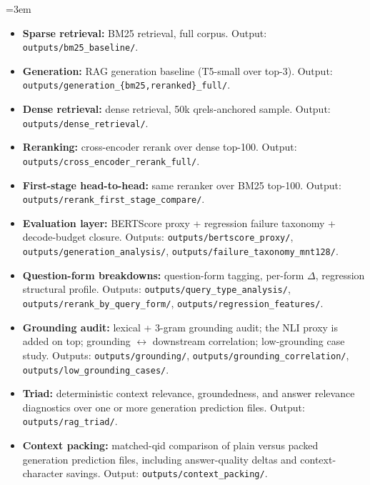 \documentclass[11pt,a4paper]{article}
\newcommand{\bertscore}{BERTScore}
\newcommand{\bmtwofive}{BM25}
\newcommand{\code}[1]{\texttt{#1}}
\begin{document}
\begingroup
\sloppy
\emergencystretch=3em
\begin{itemize}
  \item \textbf{Sparse retrieval:} \bmtwofive{} retrieval, full corpus.  Output:
        \texttt{outputs/bm25\_baseline/}.
  \item \textbf{Generation:} RAG generation baseline (T5-small over top-3).
        Output:
        \code{outputs/generation\_\allowbreak \{bm25,reranked\}\_\allowbreak full/}.
  \item \textbf{Dense retrieval:} dense retrieval, 50k qrels-anchored sample.
        Output: \texttt{outputs/dense\_retrieval/}.
  \item \textbf{Reranking:} cross-encoder rerank over dense top-100.
        Output: \texttt{outputs/cross\_encoder\_rerank\_full/}.
  \item \textbf{First-stage head-to-head:} same reranker over \bmtwofive{} top-100.
        Output:
        \code{outputs/rerank\_\allowbreak first\_\allowbreak stage\_\allowbreak compare/}.
  \item \textbf{Evaluation layer:} \bertscore{} proxy + regression failure
        taxonomy + decode-budget closure.  Outputs:
        \code{outputs/bertscore\_\allowbreak proxy/},
        \code{outputs/generation\_\allowbreak analysis/},
        \code{outputs/failure\_\allowbreak taxonomy\_\allowbreak mnt128/}.
  \item \textbf{Question-form breakdowns:} question-form tagging,
        per-form $\Delta$, regression structural profile.
        Outputs: \code{outputs/query\_\allowbreak type\_\allowbreak analysis/},
        \code{outputs/rerank\_\allowbreak by\_\allowbreak query\_\allowbreak form/},
        \code{outputs/regression\_\allowbreak features/}.
  \item \textbf{Grounding audit:} lexical + 3-gram grounding audit; the NLI
        proxy is added on top; grounding $\leftrightarrow$ downstream
        correlation; low-grounding case study.  Outputs:
        \code{outputs/grounding/},
        \code{outputs/grounding\_\allowbreak correlation/},
        \code{outputs/low\_\allowbreak grounding\_\allowbreak cases/}.
  \item \textbf{Triad:} deterministic context relevance,
        groundedness, and answer relevance diagnostics over one or
        more generation prediction files.  Output:
        \code{outputs/rag\_\allowbreak triad/}.
  \item \textbf{Context packing:} matched-qid comparison of
        plain versus packed generation prediction files, including
        answer-quality deltas and context-character savings.  Output:
        \code{outputs/context\_\allowbreak packing/}.
\end{itemize}
\endgroup
\end{document}
